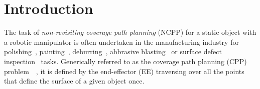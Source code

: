 \documentclass[letterpaper, 10pt, conference]{ieeeconf}
\begin{document}


\section{Introduction}

% 
% 
% 
% 

The task of \textit{non-revisiting coverage path planning} (NCPP) for a static object with a robotic manipulator is often undertaken in the manufacturing industry for polishing~\cite{tian2016polishing}, painting~\cite{li2011painting}, deburring~\cite{xie2016grinding}, abbrasive blasting~\cite{Hassan2018Collaboration} or surface defect inspection~\cite{molina2017defects} tasks. 
Generically referred to as the coverage path planning (CPP) problem~\cite{choset2001coverage}~\cite{galceran2013a}, it is defined by the end-effector (EE) traversing over all the points that define the surface of a given object once.
\end{document}
